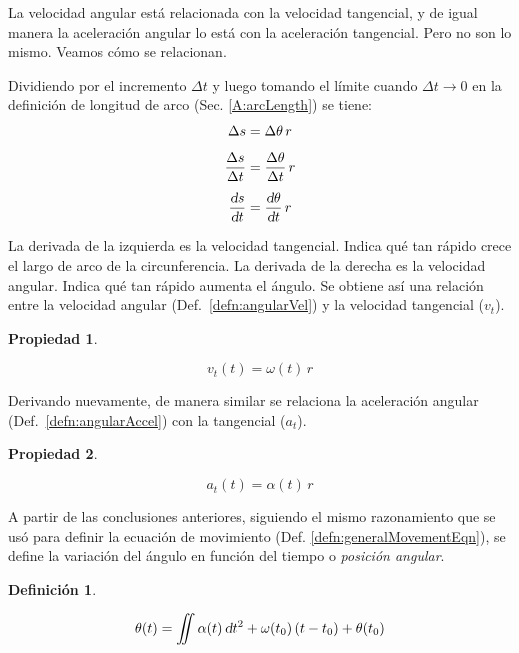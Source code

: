 \documentclass[a5paper,12pt,twoside]{book}
\newtheorem{defn}{{Definición}}[chapter]
\newtheorem{prop}{{Propiedad}}[chapter]
\begin{document}
La velocidad angular está relacionada con la velocidad tangencial, y de igual manera la aceleración angular lo está con la aceleración tangencial.
Pero no son lo mismo.
Veamos cómo se relacionan.

Dividiendo por el incremento $\Delta t$ y luego tomando el límite cuando $\Delta t \to 0$ en la definición de longitud de arco (Sec. \ref{A:arcLength}) se tiene:
\begin{align*}
    \Delta s &= \Delta \theta \, r
    \\[1ex]
    \frac{\Delta s}{\Delta t} &= \frac{\Delta \theta}{\Delta t} \, r
    \\[1ex]
    \frac{\textsl{d} s}{\textsl{d} t} &= \frac{\textsl{d} \theta}{\textsl{d} t} \, r
\end{align*}

La derivada de la izquierda es la velocidad tangencial.
Indica qué tan rápido crece el largo de arco de la circunferencia.
La derivada de la derecha es la velocidad angular.
Indica qué tan rápido aumenta el ángulo.
Se obtiene así una relación entre la velocidad angular (Def.\ \ref{defn:angularVel}) y la velocidad tangencial ($v_t$).

\begin{mdframed}[style=MyFrame1]
    \begin{prop}
        \label{prop:circularVel}
    \end{prop}
    \begin{equation*}
        v_t(t) = \omega(t) \, r
    \end{equation*}
\end{mdframed}

Derivando nuevamente, de manera similar se relaciona la aceleración angular (Def.\ \ref{defn:angularAccel}) con la tangencial ($a_t$).

\begin{mdframed}[style=MyFrame1]
    \begin{prop}
        \label{prop:circularAccel}
    \end{prop}
    \begin{equation*}
        a_t(t) = \alpha(t) \, r
    \end{equation*}
\end{mdframed}

A partir de las conclusiones anteriores, siguiendo el mismo razonamiento que se usó para definir la ecuación de movimiento (Def. \ref{defn:generalMovementEqn}), se define la variación del ángulo en función del tiempo o \emph{posición angular}.

\begin{mdframed}[style=MyFrame1]
    \begin{defn}
        \label{defn:anglePosition}
    \end{defn}
    \begin{equation*}
        \theta(t) = \iint \alpha(t) \, \textsl{d} t^2 + \omega (t_0) \left(t-t_0\right) + \theta(t_0)
    \end{equation*}
\end{mdframed}
\end{document}
